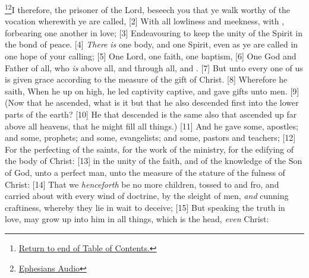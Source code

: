 \footnote{\textcolor[cmyk]{0.99998,1,0,0}{\hyperlink{TOC}{Return to end of Table of Contents.}}}\footnote{\href{https://www.audioverse.org/english/audiobibles/books/ENGKJV/N/Eph/1}{\textcolor[cmyk]{0.99998,1,0,0}{Ephesians Audio}}}\textcolor[cmyk]{0.99998,1,0,0}{I therefore, the prisoner of the Lord, beseech you that ye walk worthy of the vocation wherewith ye are called,}
[2] \textcolor[cmyk]{0.99998,1,0,0}{With all lowliness and meekness, with , forbearing one another in love;}
[3] \textcolor[cmyk]{0.99998,1,0,0}{Endeavouring to keep the unity of the Spirit in the bond of peace.}
[4] \textcolor[cmyk]{0.99998,1,0,0}{\emph{There} \emph{is} one body, and one Spirit, even as ye are called in one hope of your calling;}
[5] \textcolor[cmyk]{0.99998,1,0,0}{One Lord, one faith, one baptism,}
[6] \textcolor[cmyk]{0.99998,1,0,0}{One God and Father of all, who \emph{is} above all, and through all, and .}
[7] \textcolor[cmyk]{0.99998,1,0,0}{But unto every one of us is given grace according to the measure of the gift of Christ.}
[8] \textcolor[cmyk]{0.99998,1,0,0}{Wherefore he saith, When he  up on high, he led captivity captive, and gave gifts unto men.}
[9] \textcolor[cmyk]{0.99998,1,0,0}{(Now that he ascended, what is it but that he also descended first into the lower parts of the earth?}
[10] \textcolor[cmyk]{0.99998,1,0,0}{He that descended is the same also that ascended up far above all heavens, that he might fill all things.)}
[11] \textcolor[cmyk]{0.99998,1,0,0}{And he gave some, apostles; and some, prophets; and some, evangelists; and some, pastors and teachers;}
[12] \textcolor[cmyk]{0.99998,1,0,0}{For the perfecting of the saints, for the work of the ministry, for the edifying of the body of Christ:}
[13] \textcolor[cmyk]{0.99998,1,0,0}{ in the unity of the faith, and of the knowledge of the Son of God, unto a perfect man, unto the measure of the stature of the fulness of Christ:}
[14] \textcolor[cmyk]{0.99998,1,0,0}{That we \emph{henceforth} be no more children, tossed to and fro, and carried about with every wind of doctrine, by the sleight of men, \emph{and} cunning craftiness, whereby they lie in wait to deceive;}
[15] \textcolor[cmyk]{0.99998,1,0,0}{But speaking the truth in love, may grow up into him in all things, which is the head, \emph{even} Christ:}
